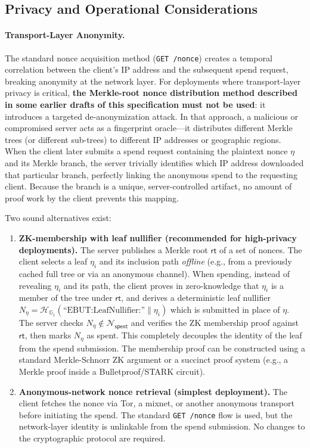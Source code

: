 \documentclass[11pt]{article}
\theoremstyle{definitionstyle}
\theoremstyle{plain}
\begin{document}
\subsection{Privacy and Operational Considerations}

\paragraph{Transport-Layer Anonymity.}
The standard nonce acquisition method (\texttt{GET /nonce}) creates a temporal correlation between the client's IP address and the subsequent spend request, breaking anonymity at the network layer. For deployments where transport-layer privacy is critical, \textbf{the Merkle-root nonce distribution method described in some earlier drafts of this specification must not be used}: it introduces a targeted de-anonymization attack. In that approach, a malicious or compromised server acts as a fingerprint oracle---it distributes different Merkle trees (or different sub-trees) to different IP addresses or geographic regions. When the client later submits a spend request containing the plaintext nonce $\eta$ and its Merkle branch, the server trivially identifies which IP address downloaded that particular branch, perfectly linking the anonymous spend to the requesting client. Because the branch is a unique, server-controlled artifact, no amount of proof work by the client prevents this mapping.

Two sound alternatives exist:

\begin{enumerate}[leftmargin=*]
  \item \textbf{ZK-membership with leaf nullifier (recommended for high-privacy deployments).}
    The server publishes a Merkle root $\mathsf{rt}$ of a set of nonces. The client selects a leaf $\eta_i$ and its inclusion path \emph{offline} (e.g., from a previously cached full tree or via an anonymous channel). When spending, instead of revealing $\eta_i$ and its path, the client proves in zero-knowledge that $\eta_i$ is a member of the tree under $\mathsf{rt}$, and derives a deterministic leaf nullifier $N_\eta = \mathcal{H}_{\mathbb{G}_1}(\text{``EBUT:LeafNullifier:''} \parallel \eta_i)$ which is submitted in place of $\eta$. The server checks $N_\eta \notin \mathcal{N}_{\mathsf{spent}}$ and verifies the ZK membership proof against $\mathsf{rt}$, then marks $N_\eta$ as spent. This completely decouples the identity of the leaf from the spend submission. The membership proof can be constructed using a standard Merkle-Schnorr ZK argument or a succinct proof system (e.g., a Merkle proof inside a Bulletproof/STARK circuit).
  \item \textbf{Anonymous-network nonce retrieval (simplest deployment).}
    The client fetches the nonce via Tor, a mixnet, or another anonymous transport before initiating the spend. The standard \texttt{GET /nonce} flow is used, but the network-layer identity is unlinkable from the spend submission. No changes to the cryptographic protocol are required.
\end{enumerate}
\end{document}
